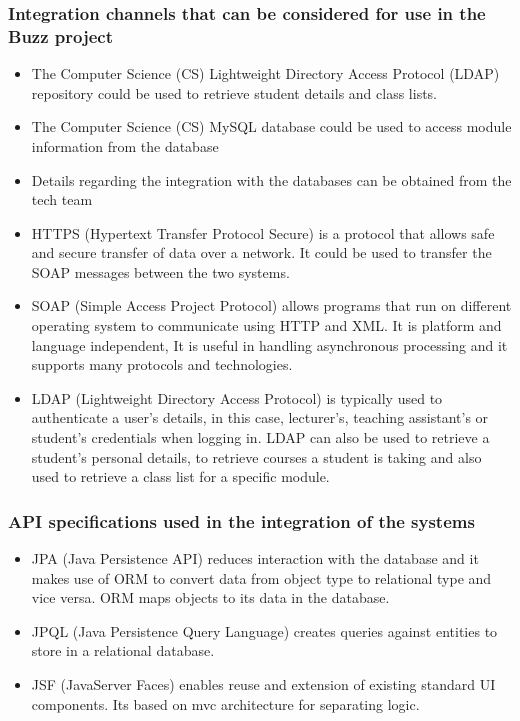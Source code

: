 \documentclass[a4paper]{article}
\begin{document}
\subsubsection{Integration channels that can be considered for use in the Buzz project}
\begin{itemize}
	\item The Computer Science (CS) Lightweight Directory Access Protocol (LDAP) repository could be used to retrieve student details and class lists.
	\item The Computer Science (CS) MySQL database could be used to access module information from the database
	\item Details regarding the integration with the databases can be obtained from the tech team 
	\item HTTPS (Hypertext Transfer Protocol Secure) is a protocol that allows safe and secure transfer of data over a network. It could be used to transfer the SOAP messages between the two systems.
	\item SOAP (Simple Access Project Protocol) allows programs that run on different operating system to communicate using HTTP and XML. It is platform and language independent, It is useful in handling asynchronous processing and it supports many protocols and technologies.
	\item LDAP (Lightweight Directory Access Protocol) is typically  used to authenticate a user’s details, in this case, lecturer’s, teaching assistant’s or student’s credentials when logging in. LDAP can also be used to retrieve a student’s personal details, to retrieve courses a student is taking and also used to retrieve a class list for a specific module.
\end{itemize}
\subsubsection{API specifications used in the integration of the systems}
\begin{itemize}
	\item JPA (Java Persistence API) reduces interaction with the database and it makes use of ORM to convert data from object type to relational type and vice versa. ORM maps objects to its data in the database.
	\item JPQL (Java Persistence Query Language) creates queries against entities to store in a relational database.
	\item JSF (JavaServer Faces) enables reuse and extension of existing standard UI components. Its based on mvc architecture for separating logic.
\end{itemize}
\end{document}
